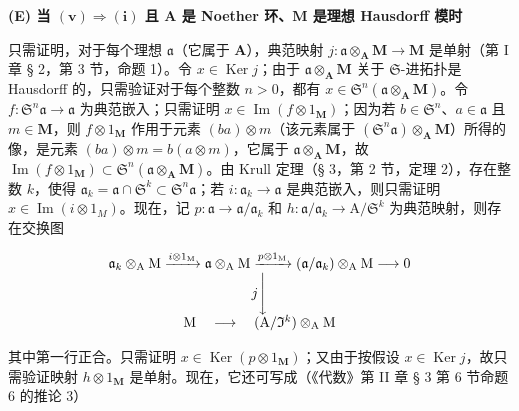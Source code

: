 \textbf{(E) 当 \((\mathbf{v})\Rightarrow (\mathbf{i})\) 且 \(\mathbf{A}\) 是 Noether 环、\(\mathbf{M}\) 是理想 Hausdorff 模时}\par

只需证明，对于每个理想 \(\mathfrak{a}\)（它属于 \(\mathbf{A}\)），典范映射 \(j\colon \mathfrak{a} \otimes_{\mathbf{A}} \mathbf{M} \to \mathbf{M}\) 是单射（第 I 章 § 2，第 3 节，命题 1）。令 \(x \in \operatorname{Ker} j\)；由于 \(\mathfrak{a} \otimes_{\mathbf{A}} \mathbf{M}\) 关于 \(\mathfrak{S}\)-进拓扑是 Hausdorff 的，只需验证对于每个整数 \(n > 0\)，都有 \(x \in \mathfrak{S}^n(\mathfrak{a} \otimes_{\mathbf{A}} \mathbf{M})\)。令 \(f\colon \mathfrak{S}^n\mathfrak{a} \to \mathfrak{a}\) 为典范嵌入；只需证明 \(x \in \operatorname{Im}(f \otimes 1_{\mathbf{M}})\)；因为若 \(b \in \mathfrak{S}^n\)、\(a \in \mathfrak{a}\) 且 \(m \in \mathbf{M}\)，则 \(f \otimes 1_{\mathbf{M}}\) 作用于元素 \((ba) \otimes m\)（该元素属于 \((\mathfrak{S}^n\mathfrak{a}) \otimes_{\mathbf{A}} \mathbf{M}\)）所得的像，是元素 \((ba) \otimes m = b(a \otimes m)\)，它属于 \(\mathfrak{a} \otimes_{\mathbf{A}} \mathbf{M}\)，故 \(\operatorname{Im}(f \otimes 1_{\mathbf{M}}) \subset \mathfrak{S}^n(\mathfrak{a} \otimes_{\mathbf{A}} \mathbf{M})\)。由 Krull 定理（§ 3，第 2 节，定理 2），存在整数 \(k\)，使得 \(\mathfrak{a}_k = \mathfrak{a} \cap \mathfrak{S}^k \subset \mathfrak{S}^n\mathfrak{a}\)；若 \(i: \mathfrak{a}_k \to \mathfrak{a}\) 是典范嵌入，则只需证明 \(x \in \operatorname{Im}(i \otimes 1_M)\)。现在，记 \(p: \mathfrak{a} \to \mathfrak{a}/\mathfrak{a}_k\) 和 \(h: \mathfrak{a}/\mathfrak{a}_k \to \mathrm{A}/\mathfrak{S}^k\) 为典范映射，则存在交换图

\[
\begin{array}{c} \mathfrak {a} _ {k} \otimes_ {\mathrm{A}} \mathrm{M} \xrightarrow {i \otimes 1 _ {\mathrm{M}}} \mathfrak {a} \otimes_ {\mathrm{A}} \mathrm{M} \xrightarrow {p \otimes 1 _ {\mathrm{M}}} (\mathfrak {a} / \mathfrak {a} _ {k}) \otimes_ {\mathrm{A}} \mathrm{M} \longrightarrow 0 \\ j \Biggl \downarrow \\ \mathrm{M} \quad \longrightarrow \quad (\mathrm{A} / \mathfrak {I} ^ {k}) \otimes_ {\mathrm{A}} \mathrm{M} \end{array}
\]

其中第一行正合。只需证明 \(x \in \operatorname{Ker}(p \otimes 1_{\mathbf{M}})\)；又由于按假设 \(x \in \operatorname{Ker} j\)，故只需验证映射 \(h \otimes 1_{\mathbf{M}}\) 是单射。现在，它还可写成（《代数》第 II 章 § 3 第 6 节命题 6 的推论 3）

